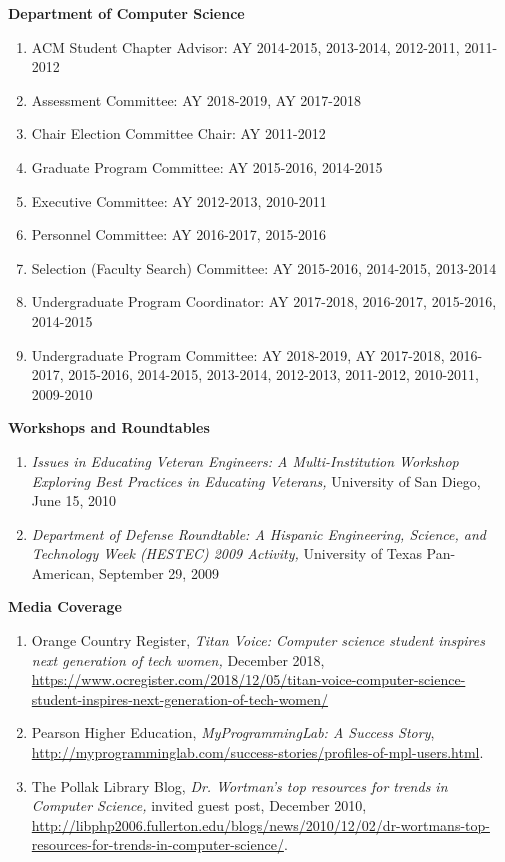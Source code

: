 \documentclass[11pt]{letter}
\begin{document}
\textbf{Department of Computer Science}
\begin{enumerate}
\item ACM Student Chapter Advisor: AY 2014-2015, 2013-2014, 2012-2011, 2011-2012
\item Assessment Committee: AY 2018-2019, AY 2017-2018
\item Chair Election Committee Chair: AY 2011-2012
\item Graduate Program Committee: AY 2015-2016, 2014-2015
\item Executive Committee: AY 2012-2013, 2010-2011
\item Personnel Committee: AY 2016-2017, 2015-2016
\item Selection (Faculty Search) Committee: AY 2015-2016, 2014-2015, 2013-2014
\item Undergraduate Program Coordinator: AY 2017-2018, 2016-2017, 2015-2016, 2014-2015
\item Undergraduate Program Committee: AY 2018-2019, AY 2017-2018, 2016-2017, 2015-2016, 2014-2015, 2013-2014, 2012-2013, 2011-2012, 2010-2011, 2009-2010
\end{enumerate}

\textbf{Workshops and Roundtables}
\begin{enumerate}
\item \emph{Issues in Educating Veteran Engineers: A Multi-Institution Workshop Exploring Best Practices in Educating Veterans,} University of San Diego, June 15, 2010
\item \emph{Department of Defense Roundtable: A Hispanic Engineering, Science, and Technology Week (HESTEC) 2009 Activity,} University of Texas Pan-American, September 29, 2009
\end{enumerate}

\textbf{Media Coverage}
\begin{enumerate}
\item Orange Country Register, \emph{Titan Voice: Computer science student inspires next generation of tech women,}
  December 2018,
  \url{https://www.ocregister.com/2018/12/05/titan-voice-computer-science-student-inspires-next-generation-of-tech-women/}
\item Pearson Higher Education, \emph{MyProgrammingLab: A Success Story}, \url{http://myprogramminglab.com/success-stories/profiles-of-mpl-users.html}.
\item The Pollak Library Blog, \emph{Dr. Wortman's top resources for trends in Computer Science,} invited guest post, December 2010, \url{http://libphp2006.fullerton.edu/blogs/news/2010/12/02/dr-wortmans-top-resources-for-trends-in-computer-science/}.
\end{enumerate}
\end{document}
